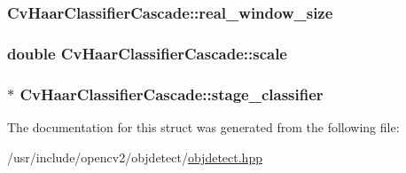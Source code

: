 \hypertarget{structCvHaarClassifierCascade_aa2fe8931f5ddca5226afdb32cea3009e}{
\subsubsection[{real\-\_\-window\-\_\-size}]{ Cv\-Haar\-Classifier\-Cascade\-::real\-\_\-window\-\_\-size}}\label{structCvHaarClassifierCascade_aa2fe8931f5ddca5226afdb32cea3009e}
\hypertarget{structCvHaarClassifierCascade_a4f8094de0e583edc4111ef2dec7635cd}{
\subsubsection[{scale}]{\setlength{\rightskip}{0pt plus 5cm}double Cv\-Haar\-Classifier\-Cascade\-::scale}}\label{structCvHaarClassifierCascade_a4f8094de0e583edc4111ef2dec7635cd}
\hypertarget{structCvHaarClassifierCascade_ac8144272b80ea6e240df6c827336004b}{
\subsubsection[{stage\-\_\-classifier}]{$\ast$ Cv\-Haar\-Classifier\-Cascade\-::stage\-\_\-classifier}}\label{structCvHaarClassifierCascade_ac8144272b80ea6e240df6c827336004b}


The documentation for this struct was generated from the following file\-:\begin{DoxyCompactItemize}
\item 
/usr/include/opencv2/objdetect/\hyperlink{objdetect_8hpp}{objdetect.\-hpp}\end{DoxyCompactItemize}
